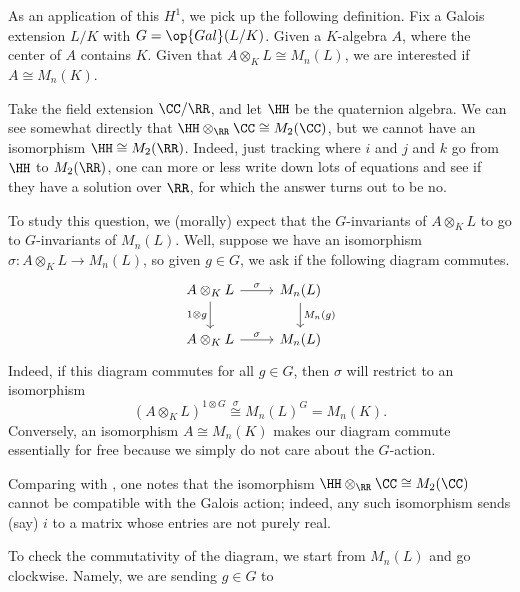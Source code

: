 \documentclass[../notes.tex]{subfiles}
\begin{document}
As an application of this $H^1$, we pick up the following definition. Fix a Galois extension $L/K$ with $G=\op{Gal}(L/K)$. Given a $K$-algebra $A$, where the center of $A$ contains $K$. Given that $A\otimes_KL\cong M_n(L)$, we are interested if $A\cong M_n(K)$.
\begin{example} \label{ex:bad-algebra}
	Take the field extension $\CC/\RR$, and let $\HH$ be the quaternion algebra. We can see somewhat directly that $\HH\otimes_\RR\CC\cong M_2(\CC)$, but we cannot have an isomorphism $\HH\cong M_2(\RR)$. Indeed, just tracking where $i$ and $j$ and $k$ go from $\HH$ to $M_2(\RR)$, one can more or less write down lots of equations and see if they have a solution over $\RR$, for which the answer turns out to be no.
\end{example}
To study this question, we (morally) expect that the $G$-invariants of $A\otimes_KL$ to go to $G$-invariants of $M_n(L)$. Well, suppose we have an isomorphism $\sigma\colon A\otimes_KL\to M_n(L)$, so given $g\in G$, we ask if the following diagram commutes.
\begin{equation}
	\begin{tikzcd}
		{A\otimes_KL} & {M_n(L)} \\
		{A\otimes_KL} & {M_n(L)}
		\arrow["\sigma", from=1-1, to=1-2]
		\arrow["{1\otimes g}"', from=1-1, to=2-1]
		\arrow["{M_n(g)}", from=1-2, to=2-2]
		\arrow["\sigma", from=2-1, to=2-2]
	\end{tikzcd} \label{eq:desired-br-commutes}
\end{equation}
Indeed, if this diagram commutes for all $g\in G$, then $\sigma$ will restrict to an isomorphism
\[(A\otimes_KL)^{1\otimes G}\stackrel\sigma\cong M_n(L)^G=M_n(K).\]
Conversely, an isomorphism $A\cong M_n(K)$ makes our diagram commute essentially for free because we simply do not care about the $G$-action.
\begin{remark}
	Comparing with , one notes that the isomorphism $\HH\otimes_\RR\CC\cong M_2(\CC)$ cannot be compatible with the Galois action; indeed, any such isomorphism sends (say) $i$ to a matrix whose entries are not purely real.
\end{remark}
To check the commutativity of the diagram, we start from $M_n(L)$ and go clockwise. Namely, we are sending $g\in G$ to
\end{document}
